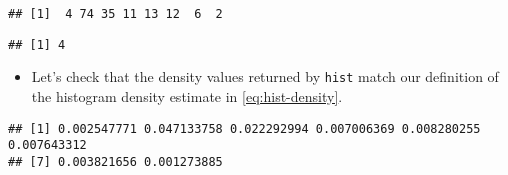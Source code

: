 \documentclass[]{book}
\newenvironment{Shaded}{\begin{snugshade}}{\end{snugshade}}
\newcommand{\CommentTok}[1]{\textcolor[rgb]{0.56,0.35,0.01}{\textit{#1}}}
\newcommand{\DecValTok}[1]{\textcolor[rgb]{0.00,0.00,0.81}{#1}}
\newcommand{\KeywordTok}[1]{\textcolor[rgb]{0.13,0.29,0.53}{\textbf{#1}}}
\newcommand{\NormalTok}[1]{#1}
\newcommand{\OperatorTok}[1]{\textcolor[rgb]{0.81,0.36,0.00}{\textbf{#1}}}
\newcommand{\StringTok}[1]{\textcolor[rgb]{0.31,0.60,0.02}{#1}}
\providecommand{\tightlist}{%
  \setlength{\itemsep}{0pt}\setlength{\parskip}{0pt}}
\begin{document}
\begin{verbatim}
## [1]  4 74 35 11 13 12  6  2
\end{verbatim}

\begin{Shaded}
\end{Shaded}

\begin{verbatim}
## [1] 4
\end{verbatim}

\begin{itemize}
\tightlist
\item
  Let's check that the density values returned by \texttt{hist} match our definition of the histogram density estimate in \eqref{eq:hist-density}.
\end{itemize}

\begin{Shaded}
\end{Shaded}

\begin{verbatim}
## [1] 0.002547771 0.047133758 0.022292994 0.007006369 0.008280255 0.007643312
## [7] 0.003821656 0.001273885
\end{verbatim}

\begin{Shaded}
\end{Shaded}
\end{document}
